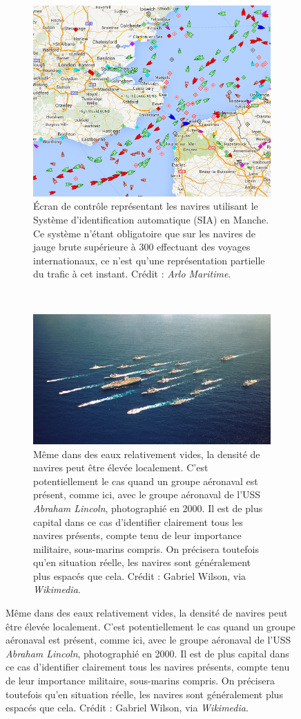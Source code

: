 	
	\begin{figure}[htb]
		\begin{subfigure}[t]{0.41\textwidth}
		\centering
		\includegraphics[width=\textwidth]{figures/ch1/channel}
		\caption[Écran de contrôle maritime en Manche (SIA).]{Écran de contrôle représentant les navires utilisant le Système d'identification automatique (SIA) en Manche. Ce système n'étant obligatoire que sur les navires de jauge brute supérieure à 300 effectuant des voyages internationaux, ce n'est qu'une représentation partielle du trafic à cet instant. Crédit : \emph{Arlo Maritime}\footnotemark.}
		\label{fig:channel}
		\end{subfigure}
		~
		\begin{subfigure}[t]{0.59\textwidth}
		\centering
		\includegraphics[width=\textwidth]{figures/ch1/lincoln}
		\caption[Le groupe aéronaval de l'USS \emph{Abraham Lincoln}.]{Même dans des eaux relativement vides, la densité de navires peut être élevée localement. C'est potentiellement le cas quand un groupe aéronaval est présent, comme ici, avec le groupe aéronaval de l'USS \emph{Abraham Lincoln}, photographié en 2000. Il est de plus capital dans ce cas d'identifier clairement tous les navires présents, compte tenu de leur importance militaire, sous-marins compris. On précisera toutefois qu'en situation réelle, les navires sont généralement plus espacés que cela. Crédit : Gabriel Wilson, via \emph{Wikimedia}.}

\end{subfigure}
\end{figure}
